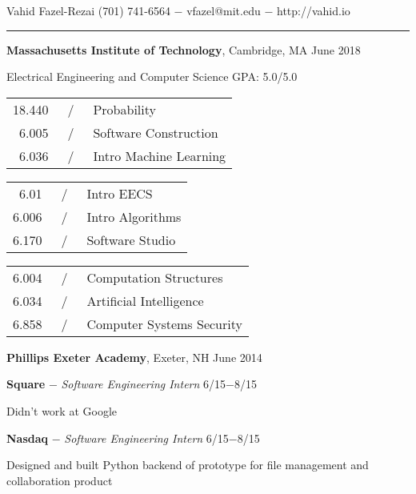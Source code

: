 \documentclass[11pt]{article}
\newcommand{\msection}[1]{\vspace{1em}\marginnote{#1}} %
\newcommand{\bt}[1]{\textbf{#1}} %
\newcommand{\gap}[0]{\vspace{0.5em}} %
\newcommand{\dash}[0]{ $-$ } %
\newcommand{\tabsep}[0]{\, / \,} %
\begin{document}

{\Huge Vahid Fazel-Rezai} \hfill  (701) 741-6564\dash vfazel@mit.edu\dash http://vahid.io

\vspace{0.2em}

\hspace{-1.2in}\rule{7.9in}{0.2em}

\vspace{-0.4em}



\msection{Education}

\bt{Massachusetts Institute of Technology}, Cambridge, MA \hfill June 2018

Electrical Engineering and Computer Science \hfill GPA: 5.0/5.0 

\vspace{0.15em}\begin{tabular}{rcl}
18.440 & \tabsep & Probability \\
6.005 & \tabsep & Software Construction \\
6.036 & \tabsep & Intro Machine Learning
\end{tabular}
\hfill
\begin{tabular}{rcl}
6.01 & \tabsep & Intro EECS \\
6.006 & \tabsep & Intro Algorithms \\
6.170 & \tabsep & Software Studio
\end{tabular}
\hfill
\begin{tabular}{rcl}
6.004 & \tabsep & Computation Structures \\
6.034 & \tabsep & Artificial Intelligence \\
6.858 & \tabsep & Computer Systems Security
\end{tabular}

\gap

\bt{Phillips Exeter Academy}, Exeter, NH \hfill June 2014



\msection{Work}

\bt{Square}\dash \emph{Software Engineering Intern} \hfill 6/15$-$8/15

Didn't work at Google

\gap


\bt{Nasdaq}\dash \emph{Software Engineering Intern} \hfill 6/15$-$8/15

Designed and built Python backend of prototype for file management and collaboration product
\end{document}
